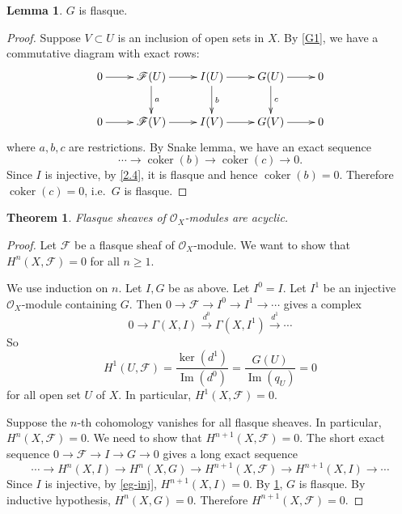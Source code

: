 \documentclass{amsart}
\numberwithin{equation}{section}
\theoremstyle{plain}
\newtheorem{thm}[equation]{Theorem}
\theoremstyle{definition}
\newtheorem{lem}[equation]{Lemma}
\DeclareMathOperator{\cok}{coker}
\DeclareMathOperator{\im}{Im}
\begin{document}
\begin{lem}\label{G2}
	$ G $ is flasque. 
\end{lem}

\begin{proof}
	Suppose $ V\subset U $ is an inclusion of open sets in $ X $. 
	By \cref{G1}, we have a commutative diagram with exact rows:
	\[
	\xymatrix{
		0\ar[r]& \mathscr F(U)\ar[r]\ar[d]^{a} & I(U)\ar[r]\ar[d]^{b} & G(U)\ar[r]\ar[d]^{c} & 0\\
		0\ar[r]& \mathscr F(V)\ar[r] & I(V)\ar[r] & G(V)\ar[r] & 0\\
	}
	\]
	where $ a,b,c $ are restrictions. 
	By Snake lemma, we have an exact sequence $$ \cdots\to\cok(b)\to \cok(c)\to 0. $$ 
	Since $ I $ is injective, by \cref{2.4}, it is flasque and hence $ \cok(b)=0 $. 
	Therefore $ \cok(c)=0 $, i.e.~$ G $ is flasque. 
\end{proof}

\begin{thm}\label{2.5}
	 Flasque sheaves of $ \mathcal O_X $-modules are acyclic. 
\end{thm}

\begin{proof}
	Let $ \mathscr F $ be a flasque sheaf of $ \mathcal O_X $-module. 
	We want to show that $ H^n(X, \mathscr F)=0 $ for all $ n\ge 1 $. 
	
	We use induction on $ n $. 
	Let $ I,G $ be as above. 
	Let $ I^0=I $. 
	Let $ I^1 $ be an injective $ \mathcal O_X $-module containing $ G $. 
	Then $ 0\to \mathscr F\to I^0\to I^1\to \cdots $ gives a complex $$ 0\to \Gamma(X, I)\xrightarrow{d^0}\Gamma(X, I^1)\xrightarrow{d^1}\cdots $$
	So $$ H^1(U, \mathscr F)=\dfrac{\ker(d^1)}{\im(d^0)}=\dfrac{G(U)}{\im(q_U)}=0 $$ for all open set $ U $ of $ X $. 
	In particular, $ H^1(X, \mathscr F)=0 $. 

	Suppose the $ n $-th cohomology vanishes for all flasque sheaves. 
	In particular, $ H^n(X, \mathscr F)=0 $. 
	We need to show that $ H^{n+1}(X, \mathscr F)=0 $. 
	The short exact sequence $ 0\to \mathscr F\to I\to G\to 0 $ gives a long exact sequence
	\[
	\cdots\to H^n(X, I)\to H^n(X, G)\to H^{n+1}(X, \mathscr F)\to H^{n+1}(X, I)\to \cdots
	\]
	Since $ I $ is injective, by \cref{eg-inj}, $ H^{n+1}(X,I)=0 $. 
	By \cref{G2}, $ G $ is flasque. 
	By inductive hypothesis, $ H^n(X, G)=0$. Therefore $H^{n+1}(X, \mathscr F)=0$. 
\end{proof}
\end{document}
